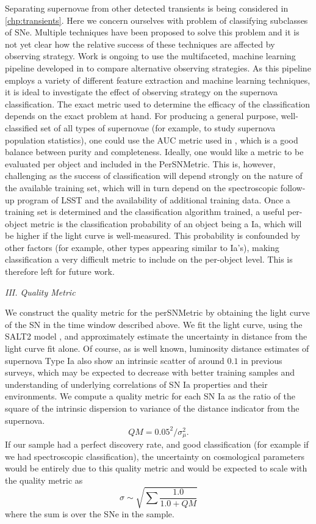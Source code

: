 Separating supernovae from other detected transients is being considered in
\autoref{chp:transients}. Here we concern ourselves with problem of classifying subclasses of
SNe. Multiple techniques have been proposed to solve this problem \citep{Frieman2008,sako2008, kessler2010b, 
ishida2012, sako2014} and it is not yet clear how the
relative success of these techniques are affected by observing strategy. Work is ongoing to use the
multifaceted, machine learning pipeline developed in \citet{Lochner2016} to compare alternative
observing strategies. As this pipeline employs a variety of different feature extraction and machine learning
techniques, it is ideal to investigate the effect of observing strategy on the supernova classification. The exact 
metric used to determine the efficacy of the classification depends
on the exact problem at hand. For producing a general purpose, well-classified set of all types of
supernovae (for example, to study supernova population statistics), one could use the AUC metric
used in \citet{Lochner2016}, which is a good balance between purity and completeness. Ideally,
one would like a metric to be evaluated per object and included in the PerSNMetric. This is,
however, challenging as the success of classification will depend strongly on the nature of the
available training set, which will in turn depend on the spectroscopic follow-up program of LSST
and the availability of additional training data. Once a training set is determined and the
classification algorithm trained, a useful per-object metric is the classification probability of an
object being a Ia, which will be higher if the light curve is well-measured. This probability is
confounded by other factors (for example, other types appearing similar to Ia's), making
classification a very difficult metric to include on the per-object level. This is therefore left for future work.


\emph{III. Quality Metric}

We construct the quality metric for the perSNMetric by obtaining the
light curve of the SN in the time window described above. We fit the
light curve, using the SALT2 model \citep{Guy2007,2014ApJ...793...16M}, and approximately estimate the uncertainty in
distance from
the light curve fit alone. Of course, as is well known, luminosity
distance estimates of supernova Type Ia also show an intrinsic scatter
of around $0.1$ in previous surveys, which may be expected to decrease
with better training samples and understanding of underlying
correlations of SN Ia properties and their environments. We compute a
quality metric for each SN Ia as the ratio of the square of the
intrinsic dispersion to variance of the distance indicator from the supernova. 
$$ QM = 0.05^2/\sigma^2_{\mu}.$$ If our sample had a perfect discovery rate, and good classification (for example if we had spectroscopic classification), the uncertainty on
cosmological parameters would be entirely due to this quality metric and would be expected to scale with the quality metric as 
$$\sigma \sim \sqrt{\sum{\frac{1.0}{1.0 + QM}}}$$
where the sum is over the SNe in the sample.


